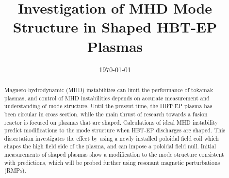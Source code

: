 \documentclass[aps,prl,twocolumn,superscriptaddress,groupedaddress]{revtex4}  %
\begin{document}
\widetext
{}


\title{Investigation of MHD Mode Structure in Shaped HBT-EP Plasmas}

\date{\today}


\begin{abstract}
Magneto-hydrodynamic (MHD) instabilities can limit the performance of tokamak plasmas, and control of MHD instabilities depends on accurate measurement and understanding of mode structure.  Until the present time, the HBT-EP plasma has been circular in cross section, while the main thrust of research towards a fusion reactor is focused on plasmas that are shaped.  Calculations of ideal MHD instability predict modifications to the mode structure when HBT-EP discharges are shaped\cite{Maurer}.  This dissertation investigates the effect by using a newly installed poloidal field coil which shapes the high field side of the plasma, and can impose a poloidal field null.  Initial measurements of shaped plasmas show a modification to the mode structure consistent with predictions, which will be probed further using resonant magnetic perturbations (RMPs).
\end{abstract}

\maketitle
\end{document}
